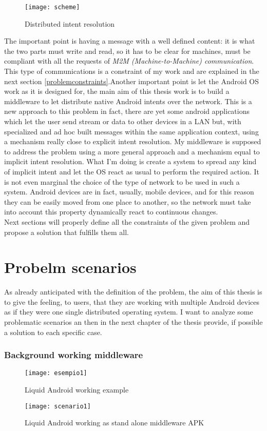 \begin{figure}[h]
	\centering
	\texttt{[image: scheme]}
	\caption{Distributed intent resolution}
	\label{fig:3.1}
\end{figure}

The important point is having a message with a well defined content: it is what the two parts must write and read, so it has to be clear for machines, must be compliant with all the requests of \textit{M2M (Machine-to-Machine) communication}. This type of communications is a constraint of my work and are explained in the next section \ref{problemconstraints}.Another important point is let the Android OS work as it is designed for, the main aim of this thesis work is to build a middleware to let distribute native Android intents over the network. This is a new approach to this problem in fact, there are yet some android applications which let the user send stream or data to other devices in a LAN but, with specialized and ad hoc built messages within the same application context, using a mechanism really close to explicit intent resolution. My middleware is supposed to address the problem using a more general approach and a mechanism equal to implicit intent resolution. What I'm doing is create a system to spread any kind of implicit intent and let the OS react as usual to perform the required action.
It is not even marginal the choice of the type of network to be used in such a system. Android devices are in fact, usually, mobile devices, and for this reason they can be easily moved from one place to another, so the network must take into account this property dynamically react to continuous changes.\\
Next sections will properly define all the constraints of the given problem and propose a solution that fulfills them all.
\section{Probelm scenarios}
As already anticipated with the definition of the problem,  the aim of this thesis is to give the feeling, to users, that they are working with multiple Android devices as if they were one single distributed operating system. I want to analyze some problematic scenarios an then in the next chapter of the thesis provide, if possible a solution to each specific case.

\subsubsection{Background working middleware}
 \begin{figure}[h]
	\centering
	\texttt{[image: esempio1]}
	\caption{Liquid Android working example}
	\label{fig:3.3}
\end{figure}
\begin{figure}[h]
	\centering
	\texttt{[image: scenario1]}
	\caption{Liquid Android working as stand alone middleware APK}
	\label{fig:3.2}
\end{figure}
 

